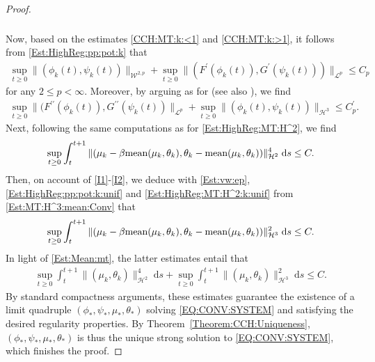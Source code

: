 \documentclass[10pt,reqno]{amsart}
\theoremstyle{remark}
\numberwithin{equation}{section}
\newcommand{\norm}[1]{\| #1 \|}
\newcommand{\scp}[2]{ ( #1 , #2  )}
\newcommand{\mean}[2]{\textnormal{mean}\scp{#1}{#2}}
\newcommand{\ds}{\;\mathrm ds}
\begin{document}
\begin{proof}
\begin{align}
\begin{split}
    \end{split}
\end{align}
Now, based on the estimates \eqref{CCH:MT:k:<1} and \eqref{CCH:MT:k:>1}, it follows from \eqref{Est:HighReg:pp:pot:k} that
\begin{align}\label{Est:HighReg:pp:pot:k:unif}
    \sup_{t\geq 0} \norm{(\phi_k(t),\psi_k(t))}_{\mathcal{W}^{2,p}} + \sup_{t\geq 0}\norm{(F^\prime(\phi_k(t)),G^\prime(\psi_k(t)))}_{\mathcal{L}^p} \leq C_p
\end{align}
for any $2 \leq p < \infty$. Moreover, by arguing as for \cite[Theorem~3.7]{Stange2025} (see also \cite{Lv2024b, Lv2024a}), we find
\begin{align*}
    \sup_{t\geq 0}\norm{(F^{\prime\prime}(\phi_k(t)), G^{\prime\prime}(\psi_k(t))}_{\mathcal{L}^p} + \sup_{t\geq 0}\norm{(\phi_k(t),\psi_k(t))}_{\mathcal{H}^3} \leq C_p^\prime.
\end{align*}
Next, following the same computations as for \eqref{Est:HighReg:MT:H^2}, we find
\begin{align}\label{Est:HighReg:MT:H^2:k:unif}
    \sup_{t\geq 0}\int_t^{t+1}\norm{(\mu_k - \beta\mean{\mu_k}{\theta_k},\theta_k - \mean{\mu_k}{\theta_k})}_{\mathcal{H}^2}^4\ds \leq C.
\end{align}
Then, on account of \eqref{I1}-\eqref{I2}, we deduce with \eqref{Est:vw:ep}, \eqref{Est:HighReg:pp:pot:k:unif} and  \eqref{Est:HighReg:MT:H^2:k:unif} from \eqref{Est:MT:H^3:mean:Conv} that
\begin{align}\label{Est:HighReg:MT:H^3:k:unif}
    \sup_{t\geq 0}\int_t^{t+1}\norm{(\mu_k - \beta\mean{\mu_k}{\theta_k},\theta_k - \mean{\mu_k}{\theta_k})}_{\mathcal{H}^3}^2\ds \leq C.
\end{align}
In light of \eqref{Est:Mean:mt}, the latter estimates entail that
\begin{align*}
    \sup_{t\geq 0}\int_t^{t+1} \norm{(\mu_k,\theta_k)}_{\mathcal{H}^2}^4\ds + \sup_{t\geq 0}\int_t^{t+1}\norm{(\mu_k,\theta_k)}_{\mathcal{H}^3}^2\ds \leq C.
\end{align*}
By standard compactness arguments, these estimates guarantee the existence of a limit quadruple $(\phi_\ast,\psi_\ast,\mu_\ast,\theta_\ast)$ solving \eqref{EQ:CONV:SYSTEM} and satisfying the desired regularity properties. By Theorem~\ref{Theorem:CCH:Uniqueness}, $(\phi_\ast,\psi_\ast,\mu_\ast,\theta_\ast)$ is thus the unique strong solution to \eqref{EQ:CONV:SYSTEM}, which finishes the proof.
\end{proof}


\medskip
\end{document}
